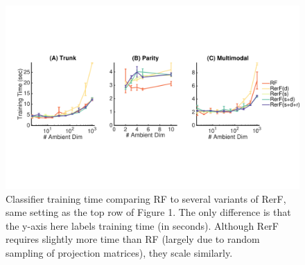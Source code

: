 \documentclass{article} %
\begin{document}
\begin{figure}[h]
\begin{center}
\includegraphics[trim=0in 3in 0in 3in, clip=true, width=\linewidth]{../Figures/pdf/Fig2_Time}
\end{center}
\caption{Classifier training time comparing RF to several variants of RerF, same setting as the top row of Figure 1. The only difference is that the y-axis here labels training time (in seconds). Although RerF requires slightly more time than RF (largely due to random sampling of projection matrices), they scale similarly.}
\end{figure}
\end{document}
